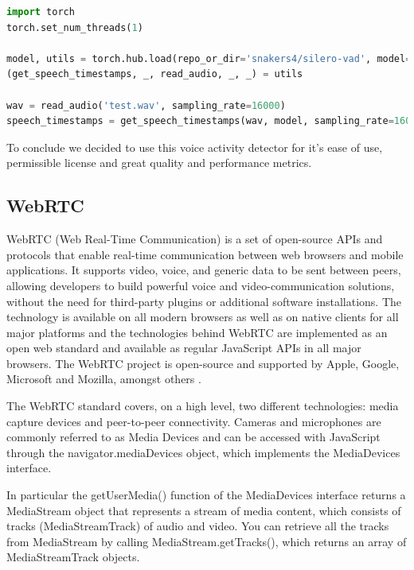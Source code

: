 \documentclass[../main.tex]{subfiles}
\begin{document}
\lstset{style=python}
\begin{lstlisting}[language=Python, caption=Silero Vad usage example]
import torch
torch.set_num_threads(1)

model, utils = torch.hub.load(repo_or_dir='snakers4/silero-vad', model='silero_vad')
(get_speech_timestamps, _, read_audio, _, _) = utils

wav = read_audio('test.wav', sampling_rate=16000)
speech_timestamps = get_speech_timestamps(wav, model, sampling_rate=16000, visualize_probs=True, return_seconds=True)
\end{lstlisting}
\label{listing:silero example}

To conclude we decided to use this voice activity detector for it's ease of use, permissible license and great quality and performance metrics.  

\subsection{WebRTC}
\label{webrtc}

WebRTC (Web Real-Time Communication) is a set of open-source APIs and protocols that enable real-time communication between web browsers and mobile applications. It supports video, voice, and generic data to be sent between peers, allowing developers to build powerful voice and video-communication solutions, without the need for third-party plugins or additional software installations. The technology is available on all modern browsers as well as on native clients for all major platforms and the technologies behind WebRTC are implemented as an open web standard and available as regular JavaScript APIs in all major browsers. The WebRTC project is open-source and supported by Apple, Google, Microsoft and Mozilla, amongst others \cite{WebRTC}.

The WebRTC standard covers, on a high level, two different technologies: media capture devices and peer-to-peer connectivity. Cameras and microphones are commonly referred to as Media Devices and can be accessed with JavaScript through the navigator.mediaDevices object, which implements the MediaDevices interface. 

In particular the getUserMedia() function of the MediaDevices interface returns a MediaStream object that represents a stream of media content, which consists of tracks (MediaStreamTrack) of audio and video. You can retrieve all the tracks from MediaStream by calling MediaStream.getTracks(), which returns an array of MediaStreamTrack objects.
\end{document}
